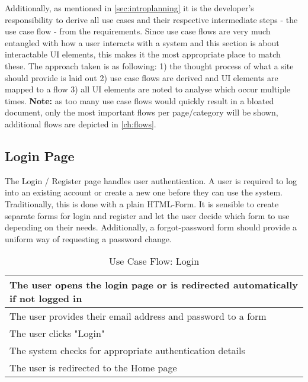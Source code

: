 Additionally, as mentioned in \autoref{sec:introplanning} it is the developer's responsibility to derive all use cases and their respective intermediate steps - the use case flow - from the requirements. Since use case flows are very much entangled with how a user interacts with a system and this section is about interactable UI elements, this makes it the most appropriate place to match these. The approach taken is as following: 1) the thought process of what a site should provide is laid out 2) use case flows are derived and UI elements are mapped to a flow 3) all UI elements are noted to analyse which occur multiple times. \textbf{Note:} as too many use case flows would quickly result in a bloated document, only the most important flows per page/category will be shown, additional flows are depicted in \autoref{ch:flows}. 

\subsection{Login Page}
The Login / Register page handles user authentication. A user is required to log into an existing account or create a new one before they can use the system. Traditionally, this is done with a plain HTML-Form. It is sensible to create separate forms for login and register and let the user decide which form to use depending on their needs. Additionally, a forgot-password form should provide a uniform way of requesting a password change. \newline

\begin{table}[H]
  \begin{tabularx}{\linewidth}{|X|}
    \hline
     The user opens the login page or is redirected automatically if not logged in \\
     \hline
     The user provides their email address and password to a form \\
     \hline
     The user clicks "Login" \\
     \hline
     The system checks for appropriate authentication details \\
     \hline
     The user is redirected to the Home page \\
     \hline 
  \end{tabularx}
  \caption{Use Case Flow: Login}
\end{table}

